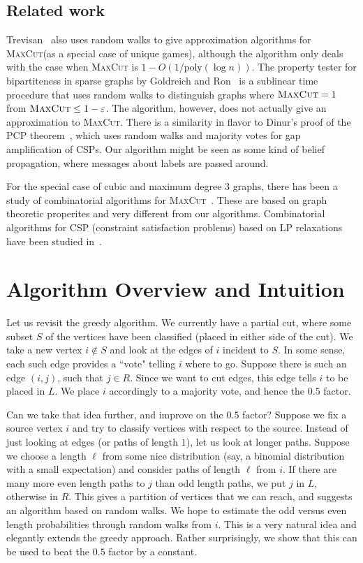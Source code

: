 \documentclass[11pt]{article}
\newcommand \poly{\mbox{poly}}
\def\epsilon{\varepsilon}
\def\maxcut{\textsc{MaxCut}\xspace}
\begin{document}
\subsection{Related work}

Trevisan~\cite{Tre05} also uses random walks to give approximation algorithms for \maxcut (as a special case of unique games), although the algorithm only deals with the case when \maxcut is $1-O(1/\poly(\log n))$.
The property tester for bipartiteness in sparse graphs
by Goldreich and Ron~\cite{GR99} is a sublinear time procedure that uses
random walks to distinguish
graphs where $\maxcut =1$ from $\maxcut \leq 1 - \epsilon$.
The algorithm, however, does not actually give an approximation to \maxcut.
There is a similarity in flavor to Dinur's proof of the PCP theorem~\cite{Din05},
which uses
random walks and majority votes for gap amplification of CSPs.
Our algorithm might be seen as some kind of belief
propagation, where messages about labels are passed around.

For the special case of cubic and maximum
degree $3$ graphs, there has been a study of combinatorial
algorithms for \maxcut~\cite{BL86,ELZ04,BT08}. These
are based on graph theoretic properites and very different
from our algorithms. Combinatorial algorithms for CSP
(constraint satisfaction problems) based on LP
relaxations have been studied in~\cite{DDFGMP03}.



\section{Algorithm Overview and Intuition}

Let us revisit the greedy algorithm. We currently have a partial
cut, where some subset $S$ of the vertices have been classified (placed
in either side of the cut). We take a new vertex $i \notin S$ and look at the
edges of $i$ incident to $S$. In some sense, each such edge provides
a ``vote" telling $i$ where to go.
Suppose there is such an edge $(i,j)$, such that $j \in R$.
Since we want to cut edges, this edge tells $i$ to be placed in $L$.
We place $i$ accordingly to a majority vote, and hence the $0.5$ factor.

Can we take that idea further, and improve on the $0.5$ factor?
Suppose we fix a source vertex $i$ and
try to classify vertices with respect to the source.
Instead of just looking at edges (or paths of length $1$),
let us look at longer paths. Suppose we choose a length
$\ell$ from some nice distribution (say, a binomial
distribution with a small expectation)
and consider paths of length $\ell$ from $i$.
If there are many more even length paths to $j$ than odd length
paths, we put $j$ in $L$, otherwise in $R$.
This gives a partition of vertices that we can reach,
and suggests an algorithm based on random walks.
We hope to estimate the odd versus even length probabilities
through random walks from $i$. This is a very natural
idea and elegantly extends the greedy approach. Rather
surprisingly, we show that this can be used to beat
the $0.5$ factor by a constant.
\end{document}

